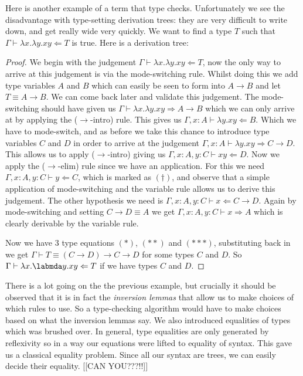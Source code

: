 \begin{example}
    Here is another example of a term that type checks. Unfortunately we see the disadvantage with type-setting derivation trees: they are very difficult to write down, and get really wide very quickly.  We want to find a type $T$ such that $\Gamma \vdash \lambda x . \lambda y . x y \Leftarrow T$ is true. Here is a derivation tree: 
        
        \begin{proof}
        We begin with the judgement $\Gamma \vdash \lambda x . \lambda y . x y \Leftarrow T$, now the only way to arrive at this judgement is via the mode-switching rule. Whilst doing this we add type variables $A$ and $B$ which can easily be seen to form into $A \to B$ and let $T \equiv A \to B$. We can come back later and validate this judgement. The mode-switching should have given us $\Gamma \vdash \lambda x . \lambda y . x y \Rightarrow A \to B$ which we can only arrive at by applying the ($\to$-intro) rule. This gives us $\Gamma , x : A \vdash \lambda y . xy \Leftarrow B$. Which we have to mode-switch, and as before we take this chance to introduce type variables $C$ and $D$ in order to arrive at the judgement $\Gamma , x : A \vdash \lambda y . x y \Rightarrow C \to D$. This allows us to apply ($\to$-intro) giving us $\Gamma , x : A , y : C \vdash xy \Leftarrow D$. Now we apply the ($\to$-elim) rule since we have an application. For this we need $\Gamma , x : A, y : C \vdash y \Leftarrow C$, which is marked as $(\dagger)$, and observe that a simple application of mode-switching and the variable rule allows us to derive this judgement. The other hypothesis we need is $\Gamma , x : A, y : C \vdash x \Leftarrow C \to D$. Again by mode-switching and setting $C \to D \equiv A$ we get $\Gamma , x : A, y : C \vdash x \Rightarrow A$ which is clearly derivable by the variable rule.
        
        Now we have 3 type equations $(*)$, $(**)$ and $(***)$, substituting back in we get $\Gamma \vdash T \equiv (C \to D) \to C \to D$ for some types $C$ and $D$. So $\Gamma \vdash \lambda x . \labmda y . x y \Leftarrow T$ if we have types $C$ and $D$.
        \end{proof}
\end{example}

\begin{remark}
    There is a lot going on the the previous example, but crucially it should be observed that it is in fact the \emph{inversion lemmas} that allow us to make choices of which rules to use. So a type-checking algorithm would have to make choices based on what the inversion lemmas say. We also introduced equalities of types which was brushed over. In general, type equalities are only generated by reflexivity so in a way our equations were lifted to equality of syntax. This gave us a classical equality problem. Since all our syntax are trees, we can easily decide their equality. [[CAN YOU???!!]]
\end{remark}

